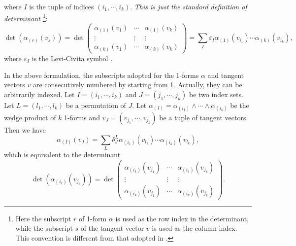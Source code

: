 \documentclass[11pt, a4paper]{book}
\begin{document}
where $I$ is the tuple of indices $(i_1,\cdots,i_k)$. \emph{This is just the standard
  definition of determinant \citep{ZeidlerOxford2004}}\footnote{Here the subscript $r$ of
  1-form $\alpha$ is used as the row index in the determinant, while the subscript $s$ of
  the tangent vector $v$ is used as the column index. This convention is different from
  that adopted in \citep{FrankelGeometry2011}.}:
\begin{equation}
  \label{eq:determinant-definition}
  \det(\alpha_{(r)}(v_{s})) = \det \begin{pmatrix}
    \alpha_{(1)}(v_{1}) & \cdots & \alpha_{(1)}(v_k) \\
    \vdots & \vdots & \vdots \\
    \alpha_{(k)}(v_1) & \cdots & \alpha_{(k)}(v_k)
  \end{pmatrix} = \sum_I \varepsilon_I \alpha_{(1)}(v_{i_1})\cdots\alpha_{(k)}(v_{i_k}),
\end{equation}
where $\varepsilon_I$ is the Levi-Civita symbol \citep{LeviCivita2023}.

In the above formulation, the subscripts adopted for the 1-forms $\alpha$ and tangent
vectors $v$ are consecutively numbered by starting from 1. Actually, they can be
arbitrarily indexed. Let $I = (i_1,\cdots,i_k)$ and $J = (j_1,\cdots,j_k)$ be two index
sets. Let $L = (l_1,\cdots,l_k)$ be a permutation of $J$. Let
$\alpha_{(I)} = \alpha_{(i_1)}\wedge\cdots\wedge\alpha_{(i_k)}$ be the wedge product of
$k$ 1-forms and $v_J = (v_{j_1},\cdots,v_{j_k})$ be a tuple of tangent vectors. Then we
have
\begin{equation}
  \label{eq:1-form-exterior-product-applied-to-k-vector}
  \alpha_{(I)}(v_J) = \sum_{L} \delta_J^{L} \alpha_{(i_1)}(v_{l_1})\cdots\alpha_{(i_k)}(v_{l_k}),
\end{equation}
which is equivalent to the determinant
\begin{equation}
  \label{eq:determinant-definition-with-general-indices}
  \det(\alpha_{(i_r)}(v_{j_s})) = \det \begin{pmatrix}
    \alpha_{(i_1)}(v_{j_1}) & \cdots & \alpha_{(i_1)}(v_{j_k}) \\
    \vdots & \vdots & \vdots \\
    \alpha_{(i_k)}(v_{j_1}) & \cdots & \alpha_{(i_k)}(v_{j_k})
  \end{pmatrix}.
\end{equation}
\end{document}
